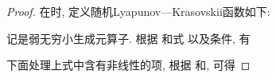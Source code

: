         \begin{proof}
        在时, 定义随机Lyapunov—Krasovskii函数如下:
        \begin{comment}
            V(t)=\frac{1}{2}e^{\top}(t)[P(u)\otimes G]e(t).
        \end{comment}
        记是弱无穷小生成元算子. 根据 和式  以及条件, 有
            \begin{comment}\label{diff:V}
            \nonumber \mathrm{E}\mathcal{L}V(t)&=\mathrm{E}\bigg\{e^{\top}(t)[P(u)\otimes G]\Big [F(e(t))-I\otimes\Delta e(t)+I\otimes\Delta e(t)-c\theta \left[L(u)\otimes\Gamma\right] H(e(t))\\
            \nonumber &\quad-c\tau[D(u)\otimes\Gamma] H(e(t))+c\tilde{e}(t)\Big]+\frac{1}{2}\sum_{v}q_{uv}e^\top(t)\left[P(v)\otimes G\right]e(t)\bigg\}\\
            \nonumber &\leq \mathrm{E}\bigg\{(\bar{\delta}-\xi)e^\top(t)[P(u)\otimes G]e(t)-c\theta e^{\top}(t)[P(u)L(u)\otimes G\Gamma] H(e(t))\\
            \nonumber &\quad-c\tau e^{\top}(t)[P(u)D(u)\otimes G\Gamma]H(e(t))+ce^{\top}(t)[P(u)\otimes G]\tilde{e}(t)\\
            &\quad+\frac{1}{2}\sum_{v}q_{uv}e^{\top}(t)\left[P(u)\otimes G\right]e(t)\bigg\}
            \end{comment}
        下面处理上式中含有非线性的项, 根据 和, 可得
            \begin{comment}\label{equ:2}
            \nonumber&\quad-\mathrm{E}\Big\{e^{\top}(t)[P(u)L(u)\otimes G\Gamma]H(e(t))\Big\}\\
            &=-\mathrm{E}\bigg\{\sum^{N}_{i=1}\sum^{N}_{j=1}e^{\top}_{i}(t)p_i(u)l_{ij}(u)G\Gamma h(e_{j}(t))\bigg\}\\
            \nonumber &=-\mathrm{E}\bigg\{\sum^{N}_{i=1}\sum^{N}_{j=1}p_i(u)l_{ij}(u)\sum^{n}_{k=1}e^{k}_{i}(t)g_{k}\gamma_{k}h_{k}(e^{k}_{j}(t))\bigg\}\\
            \nonumber &=-\mathrm{E}\bigg\{\sum^{n}_{k=1}g_{k}\gamma_{k}\sum^{N}_{i=1}\sum^{N}_{j=1}p_i(u)l_{ij}(u)e^{k}_{i}(t)h_{k}(e^{k}_{j}(t))\bigg\}\\
            \nonumber &=\mathrm{E}\bigg\{\sum^{n}_{k=1}p_{k}\gamma_{k}\sum_{j>i}p_i(u)l_{ij}(u)(e^{k}_{i}(t)-e^{k}_{j}(t))(h_{k}(e^{k}_{i}(t))-h_{k}(e^{k}_{j}(t)))\bigg\}\\
            \nonumber &\leq\underline{\alpha}\mathrm{E}\bigg\{\sum^{n}_{k=1}g_{k}\gamma_{k}\sum_{j>i}p_i(u)l_{ij}(u)(e^{k}_{i}(t)-e^{k}_{j}(t))^2\bigg\}\\

\end{comment}
\end{proof}
